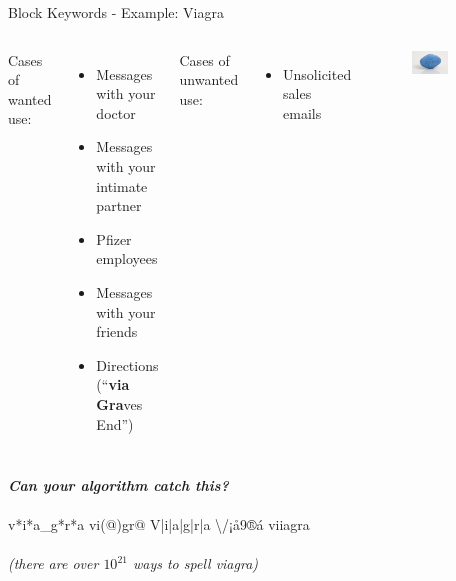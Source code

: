 \documentclass[nobackground,dvipsnames,table,aspectratio=169]{beamer}
\begin{document}
\begin{frame}{Block Keywords - Example: Viagra}
    \begin{columns}[T]
            Cases of wanted use:
            \begin{itemize}
                \item Messages with your doctor
                \item Messages with your intimate partner
                \item Pfizer employees
                \item Messages with your friends 
                \item Directions (“\textbf{via Gra}ves End”)
            \end{itemize}
            Cases of unwanted use:
            \begin{itemize}
                \item Unsolicited sales emails
            \end{itemize}
            \begin{figure}
                \includegraphics[width=0.6\textwidth]{viagra}
            \end{figure}
    \end{columns}
    \centering
    \textit{\textbf{Can your algorithm catch this?}} \\~\\
    v*i*a_g*r*a \hspace{0.04\textwidth}
    vi(@)gr@ \hspace{0.04\textwidth}
    V|i|a|g|r|a \hspace{0.04\textwidth}
    \textbackslash/¡å9®á \hspace{0.04\textwidth}
    viiagra\\~\\
    \textit{(there are over $10^{21}$ ways to spell viagra)}
\end{frame}
\end{document}
